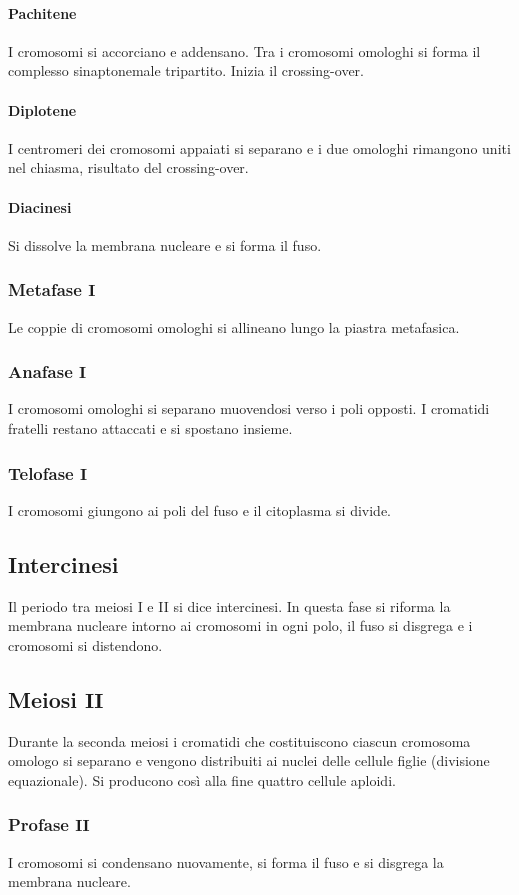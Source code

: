 \paragraph{Pachitene}
I cromosomi si accorciano e addensano. Tra i cromosomi omologhi si forma il complesso sinaptonemale tripartito. Inizia il crossing-over.
\paragraph{Diplotene}
I centromeri dei cromosomi appaiati si separano e i due omologhi rimangono uniti nel chiasma, risultato del crossing-over.
\paragraph{Diacinesi}
Si dissolve la membrana nucleare e si forma il fuso. 
\subsubsection{Metafase $\mathbf{I}$}
Le coppie di cromosomi omologhi si allineano lungo la piastra metafasica.
\subsubsection{Anafase $\mathbf{I}$}
I cromosomi omologhi si separano muovendosi verso i poli opposti. I cromatidi fratelli restano attaccati e si spostano insieme. 
\subsubsection{Telofase $\mathbf{I}$}
I cromosomi giungono ai poli del fuso e il citoplasma si divide.
\subsection{Intercinesi}
Il periodo tra meiosi I e II si dice intercinesi. In questa fase si riforma la membrana nucleare intorno ai cromosomi in ogni polo, il fuso si disgrega e i cromosomi si distendono.
\subsection{Meiosi $\mathbf{II}$}
Durante la seconda meiosi i cromatidi che costituiscono ciascun cromosoma omologo si separano e vengono distribuiti ai nuclei delle cellule figlie (divisione equazionale). Si producono
cos\`i alla fine quattro cellule aploidi. 
\subsubsection{Profase $\mathbf{II}$}
I cromosomi si condensano nuovamente, si forma il fuso e si disgrega la membrana nucleare.

